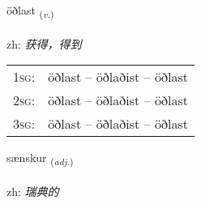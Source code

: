 \documentclass[frontgrid, backgrid]{flacards}\usepackage[]{graphicx}\usepackage[]{color}
\begin{document}
\renewcommand{\flhead}{\vskip5pt \fboxsep=0pt {\small\bfseries\footnotesize Sagnorð | 动词}}
\renewcommand{\fcfoot}{\vskip5pt \fboxsep=0pt \hspace{2pt}{\small\bfseries\footnotesize 2K}}

\renewcommand{\blhead}{\vskip5pt {\small\bfseries\footnotesize Sagnorð | 动词 }}
\renewcommand{\bcfoot}{\vskip5pt \hspace{2pt}{\small\bfseries\footnotesize 2K}}


{öðlast \small{\textsubscript{(\textit{v.})}} \\[1ex] %
\textphonetic{[œðlast]} \\
zh: \emph{获得，得到} \\  [2ex]
\renewcommand*{\arraystretch}{0.8}
\begin{tabular}{p{1cm}l}
\textsc{1sg}: & öðlast -- öðlaðist -- öðlast \\ 
\textsc{2sg}: & öðlast -- öðlaðist -- öðlast \\ 
\textsc{3sg}: & öðlast -- öðlaðist -- öðlast \\ 
\end{tabular}
}

\renewcommand{\flhead}{\vskip5pt \fboxsep=0pt {\small\bfseries\footnotesize Lýsingarorð | 形容词}}
\renewcommand{\fcfoot}{\vskip5pt \fboxsep=0pt \hspace{2pt}{\small\bfseries\footnotesize 2K}}

\renewcommand{\blhead}{\vskip5pt {\small\bfseries\footnotesize Lýsingarorð | 形容词 }}
\renewcommand{\bcfoot}{\vskip5pt \hspace{2pt}{\small\bfseries\footnotesize 2K}}


{sænskur \small{\textsubscript{(\textit{adj.})}} \\[1ex] %
\textphonetic{[sainskʏr]} \\
zh: \emph{瑞典的} \\  [2ex]
\renewcommand*{\arraystretch}{0.8}
}
\end{document}
